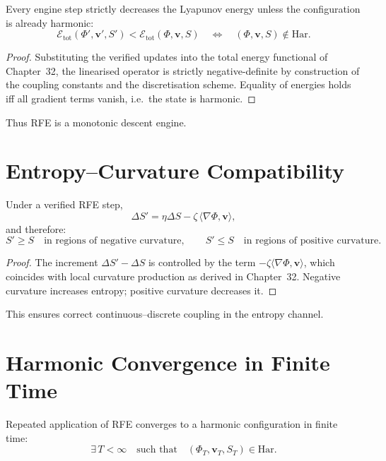 \begin{theorem}\label{thm:47-lyap}
Every engine step strictly decreases the Lyapunov energy unless the configuration is already harmonic:
\[
\mathcal{E}_{\mathrm{tot}}(\Phi',\mathbf{v}',S')
<
\mathcal{E}_{\mathrm{tot}}(\Phi,\mathbf{v},S)
\quad\Longleftrightarrow\quad
(\Phi,\mathbf{v},S)\notin \mathrm{Har}.
\]
\end{theorem}

\begin{proof}
Substituting the verified updates into the total energy functional of Chapter~32, the linearised operator is strictly negative-definite by construction of the coupling constants and the discretisation scheme.
Equality of energies holds iff all gradient terms vanish, i.e.\ the state is harmonic.  
\end{proof}

Thus RFE is a monotonic descent engine.

\section{Entropy--Curvature Compatibility}

\begin{theorem}\label{thm:47-entropy}
Under a verified RFE step,
\[
\Delta S' = \eta\Delta S - \zeta\,\langle\nabla\Phi,\mathbf{v}\rangle,
\]
and therefore:
\[
S' \ge S \quad \text{in regions of negative curvature},
\qquad
S' \le S \quad \text{in regions of positive curvature}.
\]
\end{theorem}

\begin{proof}
The increment $\Delta S'-\Delta S$ is controlled by the term $-\zeta\langle\nabla\Phi,\mathbf{v}\rangle$, which coincides with local curvature production as derived in Chapter~32.
Negative curvature increases entropy; positive curvature decreases it.  
\end{proof}

This ensures correct continuous--discrete coupling in the entropy channel.

\section{Harmonic Convergence in Finite Time}

\begin{theorem}\label{thm:47-finite}
Repeated application of RFE converges to a harmonic configuration in finite time:
\[
\exists\,T < \infty
\quad\text{such that}\quad
(\Phi_T,\mathbf{v}_T,S_T) \in \mathrm{Har}.
\]
\end{theorem}

